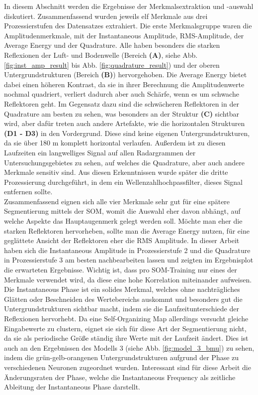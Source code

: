 In diesem Abschnitt werden die Ergebnisse der Merkmalsextraktion und -auswahl diskutiert. Zusammenfassend wurden jeweils elf Merkmale aus drei Prozessierstufen des Datensatzes extrahiert. Die erste Merkmalsgruppe waren die Amplitudenmerkmale, mit der Instantaneous Amplitude, RMS-Amplitude, der Average Energy und der Quadrature. Alle haben besonders die starken Reflexionen der Luft- und Bodenwelle (Bereich \textbf{(A)}, siehe Abb. \ref{fig:inst_amp_result} bis Abb. \ref{fig:quadrature_result}) und der oberen Untergrundstrukturen (Bereich \textbf{(B)}) hervorgehoben. Die Average Energy bietet dabei einen höheren Kontrast, da sie in ihrer Berechnung die Amplitudenwerte nochmal quadriert, verliert dadurch aber auch Schärfe, wenn es um schwache Reflektoren geht. Im Gegensatz dazu sind die schwächeren Reflektoren in der Quadrature am besten zu sehen, was besonders an der Struktur \textbf{(C)} sichtbar wird, aber dafür treten auch andere Artefakte, wie die horizontalen Strukturen \textbf{(D1 - D3)} in den Vordergrund. Diese sind keine eigenen Untergrundstrukturen, da sie über 180 m komplett horizontal verlaufen. Außerdem ist zu diesen Laufzeiten ein langwelliges Signal auf allen Radargrammen der Untersuchungsgebietes zu sehen, auf welches die Quadrature, aber auch andere Merkmale sensitiv sind. Aus diesen Erkenntnissen wurde später die dritte Prozessierung durchgeführt, in dem ein Wellenzahlhochpassfilter, dieses Signal entfernen sollte.\\
Zusammenfassend eignen sich alle vier Merkmale sehr gut für eine spätere Segmentierung mittels der SOM, womit die Auswahl eher davon abhängt, auf welche Aspekte das Hauptaugenmerk gelegt werden soll. Möchte man eher die starken Reflektoren hervorheben, sollte man die Average Energy nutzen, für eine geglättete Ansicht der Reflektoren eher die RMS Amplitude. In dieser Arbeit haben sich die Instantaneous Amplitude in Prozessierstufe 2 und die Quadrature in Prozessierstufe 3 am besten nachbearbeiten lassen und zeigten im Ergebnisplot die erwarteten Ergebnisse. Wichtig ist, dass pro SOM-Training nur eines der Merkmale verwendet wird, da diese eine hohe Korrelation miteinander aufweisen.\\
Die Instantaneous Phase ist ein solides Merkmal, welches ohne nachträgliches Glätten oder Beschneiden des Wertebereichs auskommt und besonders gut die Untergrundstrukturen sichtbar macht, indem sie die Laufzeitunterschiede der Reflexionen hervorhebt. Da eine Self-Organizing Map allerdings versucht gleiche Eingabewerte zu clustern, eignet sie sich für diese Art der Segmentierung nicht, da sie als periodische Größe ständig ihre Werte mit der Laufzeit ändert. Dies ist auch an den Ergebnissen des Modells 3 (siehe Abb. \ref{fig:model_3_bmu}) zu sehen, indem die grün-gelb-orangenen Untergrundstrukturen aufgrund der Phase zu verschiedenen Neuronen zugeordnet wurden. Interessant sind für diese Arbeit die Änderungsraten der Phase, welche die Instantaneous Frequency als zeitliche Ableitung der Instantaneous Phase darstellt.\\
